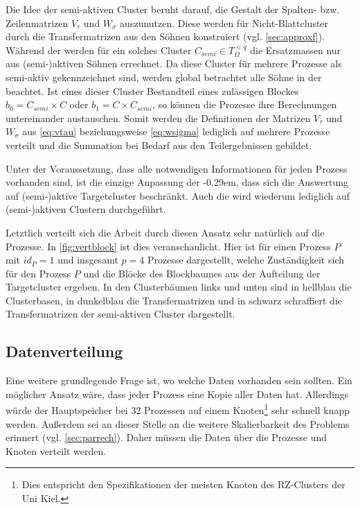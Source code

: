     Die Idee der semi-aktiven Cluster beruht darauf, die Gestalt der Spalten- bzw. Zeilenmatrizen $V_\tau$ und $W_\sigma$ auszunutzen. Diese werden für Nicht-Blattcluster durch die Transfermatrizen 
    aus den Söhnen konstruiert (vgl. \autoref{sec:approxf}). Während der \vorw werden für ein solches Cluster $C_{semi} \in T_\Omega^{<q}$ die Ersatzmassen nur aus (semi-)aktiven Söhnen
    errechnet. Da diese Cluster für mehrere Prozesse als semi-aktiv gekennzeichnet sind, werden global betrachtet alle Söhne in der \vorw beachtet. Ist eines dieser Cluster Bestandteil
    eines zulässigen Blockes $b_0 = C_{semi} \times C$ oder $b_1 = C \times C_{semi}$, so können die Prozesse ihre Berechnungen untereinander austauschen. Somit werden die Definitionen der Matrizen
    $V_\tau$ und $W_\sigma$ aus \autoref{eq:vtau} beziehungsweise \autoref{eq:wsigma} lediglich auf mehrere Prozesse verteilt und die Summation bei Bedarf aus den Teilergebnissen gebildet.
    
    Unter der Voraussetzung, dass alle notwendigen Informationen für jeden Prozess vorhanden sind, ist die einzige Anpassung der \koppl \kern-0.29em, dass sich die Auswertung auf (semi-)aktive
    Targetcluster beschränkt. Auch die \ruckw wird wiederum lediglich auf (semi-)aktiven Clustern durchgeführt.
    
    Letztlich verteilt sich die Arbeit durch diesen Ansatz sehr natürlich auf die Prozesse. In \autoref{fig:vertblock} ist dies veranschaulicht. Hier ist für einen Prozess $P$ mit $id_P = 1$ 
    und insgesamt $p = 4$ Prozesse dargestellt, welche Zuständigkeit sich für den Prozess $P$ und die Blöcke des Blockbaumes aus der Aufteilung der Targetcluster ergeben. In den Clusterbäumen links 
    und unten sind in hellblau die Clusterbasen, in dunkelblau die Transfermatrizen und in schwarz schraffiert die Transfermatrizen der semi-aktiven Cluster dargestellt.
  
  \subsection{Datenverteilung}
  \label{sec:data}
    
    Eine weitere grundlegende Frage ist, wo welche Daten vorhanden sein sollten. Ein möglicher Ansatz wäre, dass jeder Prozess eine Kopie aller Daten hat. Allerdings würde der Hauptspeicher bei 32 
    Prozessen auf einem Knoten\footnote{Dies entspricht den Spezifikationen der meisten Knoten des RZ-Clusters der Uni Kiel.}  sehr schnell 
    knapp werden. Außerdem sei an dieser Stelle an die weitere Skalierbarkeit des Problems erinnert (vgl. \autoref{sec:parrech}). Daher müssen die Daten über die Prozesse und Knoten verteilt werden. 
    
